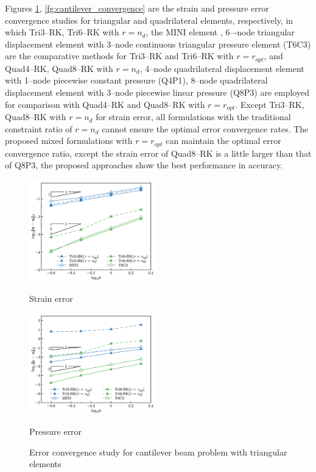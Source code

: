 Figures \ref{fg:cantilever_convergence_tri}, \ref{fg:cantilever_convergence} are the strain and pressure error convergence studies for triangular and quadrilateral elements, respectively,
in which Tri3--RK, Tri6--RK with $r=n_d$, the MINI element \cite{auricchio2005}, 6–-node triangular displacement element with 3–node continuous triangular pressure element (T6C3) are the comparative methods for Tri3--RK and Tri6--RK with $r=r_{opt}$,
and Quad4--RK, Quad8--RK with $r=n_d$, 4--node quadrilateral displacement element with 1--node piecewise constant pressure (Q4P1), 8--node quadrilateral displacement element with 3--node piecewise linear pressure (Q8P3) are employed for comparison with Quad4--RK and Quad8--RK with $r=r_{opt}$.
Except Tri3--RK, Quad8--RK with $r=n_d$ for strain error, all formulations with the traditional constraint ratio of $r=n_d$ cannot ensure the optimal error convergence rates. The proposed mixed formulations with $r=r_{opt}$ can maintain the optimal error convergence ratio, except the strain error of Quad8--RK is a little larger than that of Q8P3, the proposed approaches show the best performance in accuracy.

\begin{figure}[H]
\centering
\begin{subcaptiongroup}
\centering
\parbox[b]{0.49\textwidth}{
    \includegraphics[width=0.49\textwidth]{png/cantilever_tri_Hdev.png}
    \caption{Strain error}\label{fg:cantilever_convergence_strain_tri}
}
\parbox[b]{0.49\textwidth}{
    \includegraphics[width=0.49\textwidth]{png/cantilever_tri_L2_p.png}
    \caption{Pressure error}\label{fg:cantilever_convergence_pressure_tri}
}
\end{subcaptiongroup}
\caption{Error convergence study for cantilever beam problem with triangular elements}\label{fg:cantilever_convergence_tri}
\end{figure}

